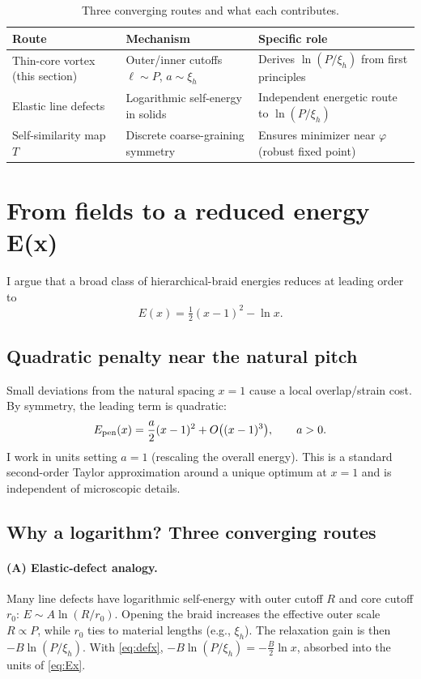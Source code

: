 \documentclass[11pt]{article}
\theoremstyle{remark}
\theoremstyle{definition}
\begin{document}
\begin{table}[t]
\centering
\caption{Three converging routes and what each contributes.}
\begin{tabularx}{\textwidth}{|Y|Y|Y|}
\hline
\textbf{Route} & \textbf{Mechanism} & \textbf{Specific role} \\
\hline
Thin-core vortex (this section) & Outer/inner cutoffs $\ell\sim P$, $a\sim \xi_h$ & Derives $\ln(P/\xi_h)$ from first principles \\
Elastic line defects & Logarithmic self-energy in solids & Independent energetic route to $\ln(P/\xi_h)$ \\
Self-similarity map $T$ & Discrete coarse-graining symmetry & Ensures minimizer near $\varphi$ (robust fixed point) \\
\hline
\end{tabularx}
\end{table}


\section{From fields to a reduced energy E(x)}
I argue that a broad class of hierarchical-braid energies reduces at leading order to
\begin{equation}
 E(x)=\tfrac12(x-1)^2-\ln x.
 \label{eq:Ex}
\end{equation}
\subsection{Quadratic penalty near the natural pitch}
Small deviations from the natural spacing $x=1$ cause a local overlap/strain cost. By symmetry, the leading term is quadratic:
\begin{equation}
 E_{\rm pen}(x)=\frac{a}{2}(x-1)^2+O\bigl((x-1)^3\bigr),\qquad a>0.
\end{equation}
I work in units setting $a=1$ (rescaling the overall energy). This is a standard second-order Taylor approximation around a unique optimum at $x=1$ and is independent of microscopic details.

\subsection{Why a logarithm? Three converging routes}
\paragraph{(A) Elastic-defect analogy.} Many line defects have logarithmic self-energy with outer cutoff $R$ and core cutoff $r_0$: $E\sim A\ln(R/r_0)$. Opening the braid increases the effective outer scale $R\propto P$, while $r_0$ ties to material lengths (e.g., $\xi_h$). The relaxation gain is then $-B\ln(P/\xi_h)$. With \eqref{eq:defx}, $-B\ln(P/\xi_h)=-\tfrac{B}{2}\ln x$, absorbed into the units of \eqref{eq:Ex}.
\end{document}

